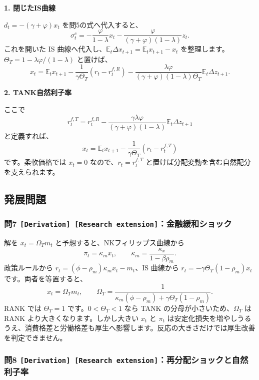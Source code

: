 \documentclass[
  japanese,
  lualatex,
  ja=standard,
  11pt,
  a4paper]{ltjsarticle}
\begin{document}
\textbf{1. 閉じたIS曲線}

\(d_t=-(\gamma+\varphi)x_t\) を問5の式へ代入すると、 \[
\sigma_t^c
=-\frac{\varphi}{1-\lambda}x_t
-\frac{\varphi}{(\gamma+\varphi)(1-\lambda)}z_t.
\] これを開いた IS
曲線へ代入し、\(\mathbb E_t\Delta x_{t+1}=\mathbb E_tx_{t+1}-x_t\)
を整理します。\(\Theta_T=1-\lambda\varphi/(1-\lambda)\) と置けば、 \[
x_t=\mathbb E_tx_{t+1}
-\frac{1}{\gamma\Theta_T}(r_t-r_t^{f,R})
-\frac{\lambda\varphi}
{(\gamma+\varphi)(1-\lambda)\Theta_T}
\mathbb E_t\Delta z_{t+1}.
\]

\textbf{2. TANK自然利子率}

ここで \[
r_t^{f,T}=r_t^{f,R}
-\frac{\gamma\lambda\varphi}
{(\gamma+\varphi)(1-\lambda)}
\mathbb E_t\Delta z_{t+1}
\] と定義すれば、 \[
x_t=\mathbb E_tx_{t+1}
-\frac{1}{\gamma\Theta_T}(r_t-r_t^{f,T})
\] です。柔軟価格では \(x_t=0\) なので、\(r_t=r_t^{f,T}\)
と置けば分配変動を含む自然配分を支えられます。

\subsection{発展問題}\label{ux767aux5c55ux554fux984c-10}

\subsubsection{\texorpdfstring{問7
\texttt{{[}Derivation{]}\ {[}Research\ extension{]}}：金融緩和ショック}{問7 {[}Derivation{]} {[}Research extension{]}：金融緩和ショック}}\label{ux554f7-derivation-research-extensionux91d1ux878dux7de9ux548cux30b7ux30e7ux30c3ux30af}

解を \(x_t=\Omega_Tm_t\) と予想すると、NKフィリップス曲線から \[
\pi_t=\kappa_mx_t,
\qquad
\kappa_m=\frac{\kappa_x}{1-\beta\rho_m}.
\] 政策ルールから \(r_t=(\phi-\rho_m)\kappa_mx_t-m_t\)、IS 曲線から
\(r_t=-\gamma\Theta_T(1-\rho_m)x_t\) です。両者を等置すると、 \[
x_t=\Omega_Tm_t,
\qquad
\Omega_T
=\frac1{\kappa_m(\phi-\rho_m)+\gamma\Theta_T(1-\rho_m)}.
\] RANK では \(\Theta_T=1\) です。\(0<\Theta_T<1\) なら TANK
の分母が小さいため、\(\Omega_T\) は RANK
より大きくなります。しかし大きい \(x_t\) と \(\pi_t\)
は安定化損失を増やしうるうえ、消費格差と労働格差も厚生へ影響します。反応の大きさだけでは厚生改善を判定できません。

\subsubsection{\texorpdfstring{問8
\texttt{{[}Derivation{]}\ {[}Research\ extension{]}}：再分配ショックと自然利子率}{問8 {[}Derivation{]} {[}Research extension{]}：再分配ショックと自然利子率}}\label{ux554f8-derivation-research-extensionux518dux5206ux914dux30b7ux30e7ux30c3ux30afux3068ux81eaux7136ux5229ux5b50ux7387}
\end{document}

